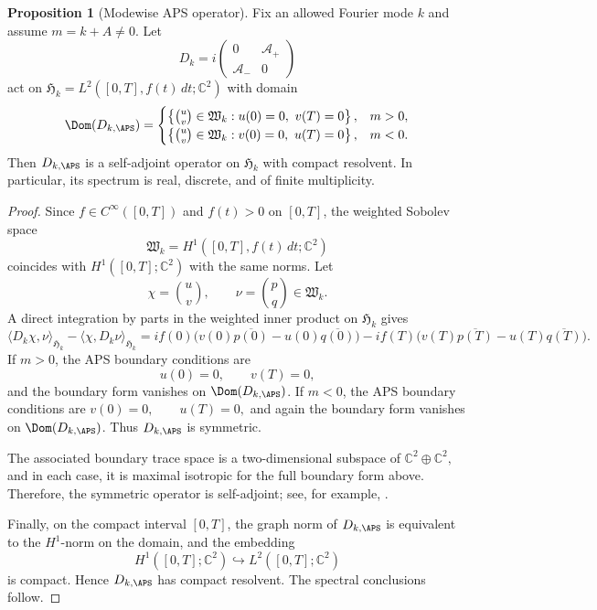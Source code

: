 \documentclass[11pt]{article}
\newcommand{\C}{\mathbb{C}}
\theoremstyle{definition}
\newtheorem{proposition}[theorem]{Proposition}
\numberwithin{equation}{section}
\begin{document}
\begin{proposition}[Modewise APS operator]
Fix an allowed Fourier mode \(k\) and assume \(m=k+A\neq 0\). Let
\begin{equation}
D_k=
i\begin{pmatrix}
0 & \mathcal A_+\\
\mathcal A_- & 0
\end{pmatrix}
\end{equation}
act on $ \mathfrak H_k=L^2([0,T],f(t)\,dt;\C^2) $
with domain
\begin{equation}
\Dom(D_{k,\APS})=
\begin{cases}
\left\{\binom{u}{v}\in \mathfrak W_k : u(0)=0,\ v(T)=0\right\}, & m>0,\\
\left\{\binom{u}{v}\in \mathfrak W_k : v(0)=0,\ u(T)=0\right\}, & m<0.
\end{cases}
\end{equation}
Then \(D_{k,\APS}\) is a self-adjoint operator on \(\mathfrak H_k\) with compact resolvent. In particular, its spectrum is real, discrete, and of finite multiplicity.
\end{proposition}

\begin{proof}
Since \(f\in C^\infty([0,T])\) and \(f(t)>0\) on \([0,T]\), the weighted Sobolev space
\begin{equation}
\mathfrak W_k=H^1([0,T],f(t)\,dt;\C^2)
\end{equation}
coincides with \(H^1([0,T];\C^2)\) with the same norms. Let
\begin{equation}
\chi =\binom{u}{v},\qquad \nu=\binom{p}{q}\in \mathfrak W_k.
\end{equation}
A direct integration by parts in the weighted inner product on \(\mathfrak H_k\) gives
\begin{equation}
\langle D_k\chi,\nu\rangle_{\mathfrak H_k}
-
\langle \chi,D_k\nu\rangle_{\mathfrak H_k}
=
i f(0)\bigl(v(0)\overline{p(0)}-u(0)\overline{q(0)}\bigr)
-
i f(T)\bigl(v(T)\overline{p(T)}-u(T)\overline{q(T)}\bigr).
\end{equation}
If \(m>0\), the APS boundary conditions are
\begin{equation}
u(0)=0,\qquad v(T)=0,
\end{equation}
and the boundary form vanishes on \(\Dom(D_{k,\APS})\). If \(m<0\), the APS boundary conditions are $
v(0)=0,\qquad u(T)=0,$ and again the boundary form vanishes on \(\Dom(D_{k,\APS})\). Thus \(D_{k,\APS}\) is symmetric.

The associated boundary trace space is a two-dimensional subspace of $ \C^2\oplus \C^2,$
and in each case, it is maximal isotropic for the full boundary form above. Therefore, the symmetric operator is self-adjoint; see, for example, \cite{BoossWojciechowski,BaerBallmann2012}.

Finally, on the compact interval \([0,T]\), the graph norm of \(D_{k,\APS}\) is equivalent to the \(H^1\)-norm on the domain, and the embedding
\begin{equation}
H^1([0,T];\C^2)\hookrightarrow L^2([0,T];\C^2)
\end{equation}
is compact. Hence \(D_{k,\APS}\) has compact resolvent. The spectral conclusions follow.
\end{proof}
\end{document}

